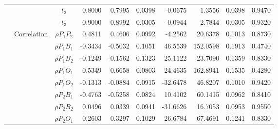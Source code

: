 \documentclass[letterpaper]{article}
\begin{document}
\begin{table}[h]
\begin{tabular}{cccrrrrrrr}
            &             & $t_2$          & 0.8000                 & 0.7995                 & 0.0398                 & -0.0675                & 1.3556                 & 0.0398                   & 0.9470                 \\
            &             & $t_3$          & 0.9000                 & 0.8992                 & 0.0305                 & -0.0944                & 2.7844                 & 0.0305                   & 0.9320                 \\
            & Correlation & $\rho{P_1P_2}$ & 0.4811                 & 0.4606                 & 0.0992                 & -4.2562                & 20.6378                & 0.1013                   & 0.8730                 \\
            &             & $\rho{P_1B_1}$ & -0.3434                & -0.5032                & 0.1051                 & 46.5539                & 152.0598               & 0.1913                   & 0.4740                 \\
            &             & $\rho{P_1B_2}$ & -0.1249                & -0.1562                & 0.1323                 & 25.1122                & 23.7090                & 0.1359                   & 0.8330                 \\
            &             & $\rho{P_1O_1}$ & 0.5349                 & 0.6658                 & 0.0803                 & 24.4635                & 162.8941               & 0.1535                   & 0.4280                 \\
            &             & $\rho{P_1O_2}$ & -0.1313                & -0.0884                & 0.0915                 & -32.6478               & 46.8207                & 0.1010                   & 0.9420                 \\
            &             & $\rho{P_2B_1}$ & -0.4763                & -0.5258                & 0.0824                 & 10.4102                & 60.1415                & 0.0962                   & 0.8410                 \\
            &             & $\rho{P_2B_2}$ & 0.0496                 & 0.0339                 & 0.0941                 & -31.6626               & 16.7053                & 0.0953                   & 0.9550                 \\
            &             & $\rho{P_2O_1}$ & 0.2603                 & 0.3297                 & 0.1029                 & 26.6784                & 67.4691                & 0.1241                   & 0.8330                 \\

\end{tabular}
\end{table}
\end{document}
